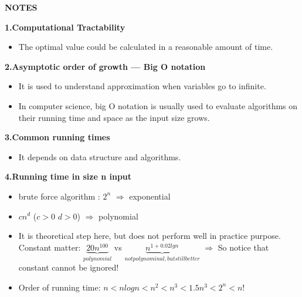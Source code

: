 \setlength{\parindent}{4em}
\setlength{\parskip}{1em}
\renewcommand{\baselinestretch}{1}
 
\textbf{NOTES}

\textbf{1.Computational Tractability} 
\begin{itemize}
\item 
The optimal value could be calculated in a reasonable amount of time.
\end{itemize}

\textbf{2.Asymptotic order of growth --- Big O notation}
\begin{itemize}
\item
It is used to understand approximation when variables go to infinite. 
\item
In computer science, big O notation is usually used to evaluate algorithms on their running time and space as the input size grows.
\end{itemize}

\textbf{3.Common running times} 
\begin{itemize}
\item 
It depends on data structure and algorithms.
\end{itemize}

\textbf{4.Running time in size n input}
\begin{itemize}
\item 
brute force algorithm : $2^{n}$ $\Rightarrow$ exponential 
\item
$c n^{d}$ ($c>0$ $d>0$) $\Rightarrow$ polynomial
\item
It is theoretical step here, but does not perform well in practice purpose. \\ 
Constant matter: $\underbrace{20 n^{100}}_{polynomial}$ vs $\underbrace{n^{1+0.02 lgn}}_{not polynominal, but still better}$ $\Rightarrow$ So notice that constant cannot be ignored! \\
\item
Order of running time: $n<nlogn<n^{2}<n^{3}<1.5 n^{3}<2^{n}<n!$
\end{itemize}



